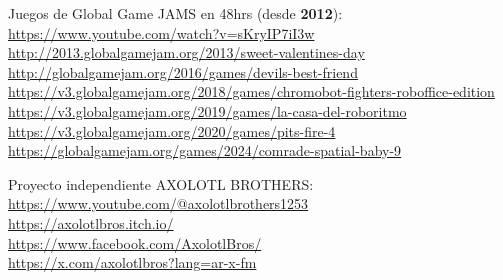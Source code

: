 \documentclass{article}
\begin{document}
Juegos de Global Game JAMS en 48hrs (desde \textbf{2012}): \\
\url{https://www.youtube.com/watch?v=sKryIP7iI3w} \\
\url{http://2013.globalgamejam.org/2013/sweet-valentines-day} \\
\url{http://globalgamejam.org/2016/games/devils-best-friend}\\
\url{https://v3.globalgamejam.org/2018/games/chromobot-fighters-roboffice-edition}\\
\url{https://v3.globalgamejam.org/2019/games/la-casa-del-roboritmo}\\
\url{https://v3.globalgamejam.org/2020/games/pits-fire-4}\\
\url{https://globalgamejam.org/games/2024/comrade-spatial-baby-9}


Proyecto independiente AXOLOTL BROTHERS:
\url{https://www.youtube.com/@axolotlbrothers1253} \\
\url{https://axolotlbros.itch.io/} \\
\url{https://www.facebook.com/AxolotlBros/} \\
\url{https://x.com/axolotlbros?lang=ar-x-fm}
\end{document}
